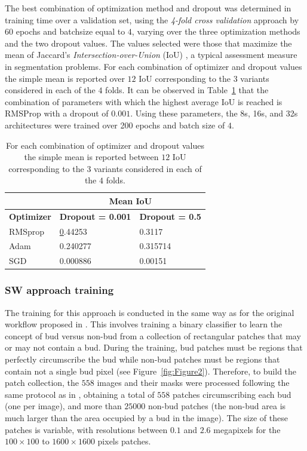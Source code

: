 \documentclass[a4paper,authoryear,review]{elsarticle}
\begin{document}
The best combination of optimization method and dropout was determined in training time over a validation set, using the \emph{4-fold cross validation} approach by 60 epochs and batchsize equal to $4$, varying over the three optimization methods and the two dropout values. The values selected were those that maximize the mean of Jaccard's \emph{Intersection-over-Union} (IoU) \citep{jaccard1912distribution}, a typical assessment measure in segmentation problems. For each combination of optimizer and dropout values the simple mean is reported over $12$ IoU corresponding to the $3$ variants considered in each of the $4$ folds. It can be observed in Table~\ref{tab:Table2} that the combination of parameters with which the highest average IoU is reached is RMSProp with a dropout of $0.001$. Using these parameters, the 8s, 16s, and 32s architectures were trained over 200 epochs and batch size of $4$.

\begin{table}[]
    \centering
        \begin{tabular}{lll}
            \hline
            \multicolumn{1}{|l|}{} & \multicolumn{2}{c|}{\textbf{Mean IoU}} \\ \hline
            \multicolumn{1}{|c|}{\textbf{Optimizer}} & \multicolumn{1}{c|}{\textbf{Dropout = 0.001}} & \multicolumn{1}{c|}{\textbf{Dropout = 0.5}} \\ \hline
            RMSprop & {\ul 0.44253} & 0.3117 \\
            Adam & 0.240277 & 0.315714 \\
            SGD & 0.000886 & 0.00151 \\ \hline
    \end{tabular}%
    \caption{
For each combination of optimizer and dropout values the simple mean is reported between $12$ IoU corresponding to the $3$ variants considered in each of the $4$ folds.
}
    \label{tab:Table2}
\end{table}


\subsubsection{SW approach training}
\label{sec:swtrain}

The training for this approach is conducted in the same way as for the original workflow proposed in \citet{perez2017image}. This involves training a binary classifier to learn the concept of bud versus non-bud from a collection of rectangular patches that may or may not contain a bud. During the training, bud patches must be regions that perfectly circumscribe the bud while non-bud patches must be regions that contain not a single bud pixel (see Figure~\ref{fig:Figure2}). Therefore, to build the patch collection, the $558$ images and their masks were processed following the same protocol as in \citet{perez2017image}, obtaining a total of  $558$ patches circumscribing each bud (one per image), and more than $25000$ non-bud patches (the non-bud area is much larger than the area occupied by a bud in the image). The size of these patches is variable, with resolutions between $0.1$ and $2.6$ megapixels  for the  $100 \times 100$ to $1600 \times 1600$ pixels patches.
\end{document}
